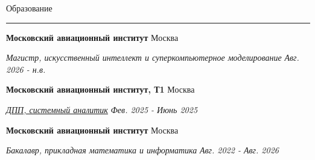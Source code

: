 \documentclass[14pt, a4paper, oneside]{extarticle}
\begin{document}
\begin{flushleft}
	\vspace{-\intextsep}
	\large Образование
\end{flushleft}

\vspace{-0.8\intextsep}
\hrule


\begin{flushleft}
	\vspace{-0.8\intextsep}
	\quad
	\textbf{Московский авиационный институт}
	\hfill
	Москва
\end{flushleft}

\begin{flushleft}
	\vspace{-\intextsep}
	\quad
	\textit{\footnotesize Магистр, %
	искусственный интеллект и суперкомпьютерное моделирование}
	\hfill
	\textit{\small Авг. 2026 - н.в.}
\end{flushleft}


\begin{flushleft}
	\vspace{-0.8\intextsep}
	\quad
	\textbf{Московский авиационный институт, Т1}
	\hfill
	Москва
\end{flushleft}

\begin{flushleft}
	\vspace{-\intextsep}
	\quad
	\href{https://github.com/Crazy5202/job_application_form/tree/main/portfolio/T1/%D0%A21_%D1%81%D0%B5%D1%80%D1%82%D0%B8%D1%84%D0%B8%D0%BA%D0%B0%D1%82.pdf}{\textit{ДПП, системный аналитик}}
	\hfill
	\textit{\small Фев. 2025 - Июнь 2025}
\end{flushleft}


\begin{flushleft}
	\vspace{-0.8\intextsep}
	\quad
	\textbf{Московский авиационный институт}
	\hfill
	Москва
\end{flushleft}

\begin{flushleft}
	\vspace{-\intextsep}
	\quad
	\textit{Бакалавр, прикладная математика и информатика}
	\hfill
	\textit{\small Авг. 2022 - Авг. 2026}
\end{flushleft}

\end{document}
